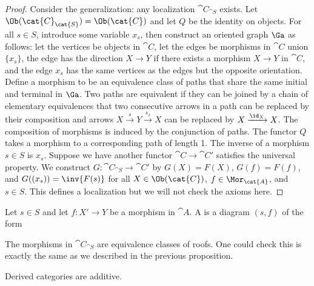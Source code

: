 \begin{proof}
    Consider the generalization: any localization ${\cat{C}}_{\cat{S}}$ exists. Let $\Ob({\cat{C}}_{\cat{S}})=\Ob(\cat{C})$ and let $Q$ be the identity on objects. For all $s\in S$, introduce some variable ${x}_{s}$, then construct an oriented graph $\Ga$ as follows: let the vertices be objects in $\cat{C}$, let the edges be morphisms in $\cat{C}$ union $\{{x}_{s}\}$, the edge has the direction $X\to Y$ if there exists a morphism $X\to Y$ in $\cat{C}$, and the edge ${x}_{s}$ has the same vertices as the edges but the opposite orientation. Define a morphism to be an equivalence class of paths that share the same initial and terminal in $\Ga$. Two paths are equivalent if they can be joined by a chain of elementary equivalences that two consecutive arrows in a path can be replaced by their composition and  arrows $X\xrightarrow{s}Y\xrightarrow{{s}_{x}}X$ can be replaced by $X\xrightarrow{{\id}_{X}}X$. The composition of morphisms is induced by the conjunction of paths. The functor $Q$ takes a morphism to a corresponding path of length 1. The inverse of a morphism $s\in S$ is ${x}_{s}$. Suppose we have another functor $\cat{C}\to\cat{C}'$ satisfies the universal property. We construct $G:{\cat{C}}_{\cat{S}}\to\cat{C}'$ by $G(X)=F(X)$, $G(f)=F(f)$, and $G(({x}_{s}))=\inv{F(s)}$ for all $X\in\Ob(\cat{C})$, $f\in{\Mor}_{\cat{A}}$, and $s\in S$. This defines a localization but we will not check the axioms here.
\end{proof}
\par
Let $s\in S$ and let $f:X'\to Y$ be a morphism in $\cat{A}$. A  is a diagram $(s,f)$ of the form 
\begin{center}
\end{center}
The morphisms in ${\cat{C}}_{\cat{S}}$ are equivalence classes of roofs. One could check this is exactly the same as we described in the previous proposition.
\begin{proposition}
    Derived categories are additive.
\end{proposition}
